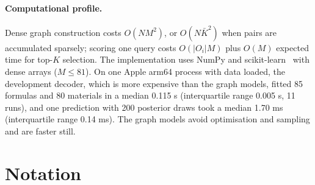 \documentclass[applsci,article,submit,oneauthor]{Definitions/mdpi}
\begin{document}
\paragraph{Computational profile.} Dense graph construction costs $O(NM^2)$, or $O(N\bar K^2)$ when pairs are accumulated sparsely; scoring one query costs $O(|O_i|M)$ plus $O(M)$ expected time for top-$K$ selection. The implementation uses NumPy and scikit-learn~\cite{pedregosa2011} with dense arrays ($M\le81$). On one Apple arm64 process with data loaded, the development decoder, which is more expensive than the graph models, fitted 85 formulas and 80 materials in a median 0.115 s (interquartile range 0.005 s, 11 runs), and one prediction with 200 posterior draws took a median 1.70 ms (interquartile range 0.14 ms). The graph models avoid optimisation and sampling and are faster still.

\section[\appendixname~\thesection]{Notation}
\label{app:notation}
\end{document}
